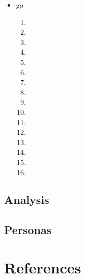 \documentclass[titlepage]{article}
\begin{document}
\begin{itemize}
\begin{enumerate}
                            \item
                            \item
                            \item
                            \item
                            \item
                            \item
                        \end{enumerate}
                    \item go
                        \begin{enumerate}
                            \item
                            \item
                            \item
                            \item
                            \item
                            \item
                            \item
                            \item
                            \item
                            \item
                            \item
                            \item
                            \item
                            \item
                            \item
                            \item
                        \end{enumerate}
                \end{itemize}

        \subsection{Analysis}
            \blindtext

        \subsection{Personas}
            \blindtext

\section{References}


\end{document}

